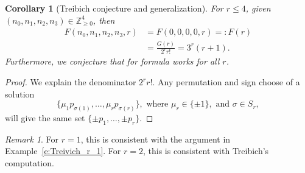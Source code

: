 \documentclass[11pt]{amsart}
\newtheorem{corollary}[theorem]{Corollary}
\theoremstyle{remark}
\newtheorem{remark}[theorem]{Remark}
\numberwithin{equation}{section}
\begin{document}
\begin{corollary}[Treibich conjecture and generalization] \label{cor:Treibich}  For $r \leq 4$, given $(n_0,n_1,n_2,n_3) \in \mathbb{Z}_{\geq 0}^4$, then 
\[
\begin{split}
    F(n_0,n_1,n_2,n_3,r) &= F(0,0,0,0,r) =: F(r)
    \\
    & = \frac{G(r)}{2^r r!} = 3^r (r+1).
\end{split}
\]
Furthermore, we conjecture that for formula works for all $r$.
\end{corollary}
\begin{proof}
We explain the denominator $2^r r!$. Any permutation and sign choose of a solution 
\[
    \{ \mu_1 p_{\sigma(1)}, \dots, \mu_r p_{\sigma(r)}   \}, \text{ where }\mu_r \in \{ \pm 1\}, \text{ and } \sigma\in S_r,
\]
will give the same set $\{ \pm p_1,\dots,\pm p_r \}$.
\end{proof}


\begin{remark}
For $r=1$, this is consistent with the argument in Example~\ref{e:Treivich_r_1}. For $r=2$, this is consistent with Treibich's computation.
\end{remark}
\appendix





    

\end{document}
